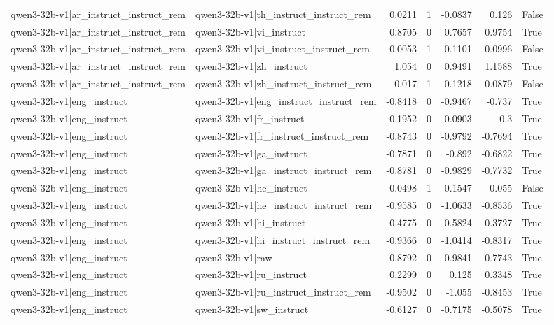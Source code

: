 \begin{table}
\begin{tabular}{l l r r r r l}
qwen3-32b-v1|ar_instruct_instruct_rem & qwen3-32b-v1|th_instruct_instruct_rem & 0.0211 & 1 & -0.0837 & 0.126 & False \\
qwen3-32b-v1|ar_instruct_instruct_rem & qwen3-32b-v1|vi_instruct & 0.8705 & 0 & 0.7657 & 0.9754 & True \\
qwen3-32b-v1|ar_instruct_instruct_rem & qwen3-32b-v1|vi_instruct_instruct_rem & -0.0053 & 1 & -0.1101 & 0.0996 & False \\
qwen3-32b-v1|ar_instruct_instruct_rem & qwen3-32b-v1|zh_instruct & 1.054 & 0 & 0.9491 & 1.1588 & True \\
qwen3-32b-v1|ar_instruct_instruct_rem & qwen3-32b-v1|zh_instruct_instruct_rem & -0.017 & 1 & -0.1218 & 0.0879 & False \\
qwen3-32b-v1|eng_instruct & qwen3-32b-v1|eng_instruct_instruct_rem & -0.8418 & 0 & -0.9467 & -0.737 & True \\
qwen3-32b-v1|eng_instruct & qwen3-32b-v1|fr_instruct & 0.1952 & 0 & 0.0903 & 0.3 & True \\
qwen3-32b-v1|eng_instruct & qwen3-32b-v1|fr_instruct_instruct_rem & -0.8743 & 0 & -0.9792 & -0.7694 & True \\
qwen3-32b-v1|eng_instruct & qwen3-32b-v1|ga_instruct & -0.7871 & 0 & -0.892 & -0.6822 & True \\
qwen3-32b-v1|eng_instruct & qwen3-32b-v1|ga_instruct_instruct_rem & -0.8781 & 0 & -0.9829 & -0.7732 & True \\
qwen3-32b-v1|eng_instruct & qwen3-32b-v1|he_instruct & -0.0498 & 1 & -0.1547 & 0.055 & False \\
qwen3-32b-v1|eng_instruct & qwen3-32b-v1|he_instruct_instruct_rem & -0.9585 & 0 & -1.0633 & -0.8536 & True \\
qwen3-32b-v1|eng_instruct & qwen3-32b-v1|hi_instruct & -0.4775 & 0 & -0.5824 & -0.3727 & True \\
qwen3-32b-v1|eng_instruct & qwen3-32b-v1|hi_instruct_instruct_rem & -0.9366 & 0 & -1.0414 & -0.8317 & True \\
qwen3-32b-v1|eng_instruct & qwen3-32b-v1|raw & -0.8792 & 0 & -0.9841 & -0.7743 & True \\
qwen3-32b-v1|eng_instruct & qwen3-32b-v1|ru_instruct & 0.2299 & 0 & 0.125 & 0.3348 & True \\
qwen3-32b-v1|eng_instruct & qwen3-32b-v1|ru_instruct_instruct_rem & -0.9502 & 0 & -1.055 & -0.8453 & True \\
qwen3-32b-v1|eng_instruct & qwen3-32b-v1|sw_instruct & -0.6127 & 0 & -0.7175 & -0.5078 & True \\

\end{tabular}
\end{table}
